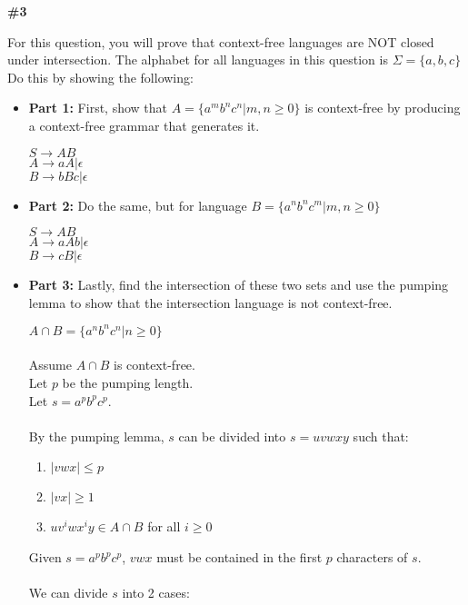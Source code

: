 \documentclass{article}
\newcommand{\problem}[1]{\textbf{\##1}}
\begin{document}
\pagebreak

\problem{3}

For this question, you will prove that context-free languages are NOT closed under intersection. The alphabet for all languages in this question is $\Sigma = \{a,b,c\}$ Do this by showing the following:

\begin{itemize}
	\item \textbf{Part 1:} First, show that $A=\{a^mb^nc^n | m,n \geq 0\}$ is context-free by producing a context-free grammar that generates it.
	
    $S \rightarrow AB $\\
    $A \rightarrow aA | \epsilon$\\
    $B \rightarrow bBc | \epsilon$

	\item \textbf{Part 2:} Do the same, but for language $B=\{a^nb^nc^m | m,n \geq 0\}$
	
    $S \rightarrow AB $\\
    $A \rightarrow aAb | \epsilon$\\
    $B \rightarrow cB | \epsilon$

	\item \textbf{Part 3:} Lastly, find the intersection of these two sets and use the pumping lemma to show that the intersection language is not context-free.
	
    $A \cap B = \{a^nb^nc^n | n \geq 0\}$\\
    \\
    Assume $A \cap B$ is context-free.\\
    Let $p$ be the pumping length.\\
    Let $s = a^pb^pc^p$.\\
    \\
    By the pumping lemma, $s$ can be divided into $s = uvwxy$ such that:
    \begin{enumerate}
        \item $|vwx| \leq p$
        \item $|vx| \geq 1$
        \item $uv^iwx^iy \in A \cap B$ for all $i \geq 0$
    \end{enumerate}

    Given $s = a^pb^pc^p$, $vwx$ must be contained in the first $p$ characters of $s$.\\
    \\
    We can divide $s$ into 2 cases:


\end{itemize}
\end{document}
